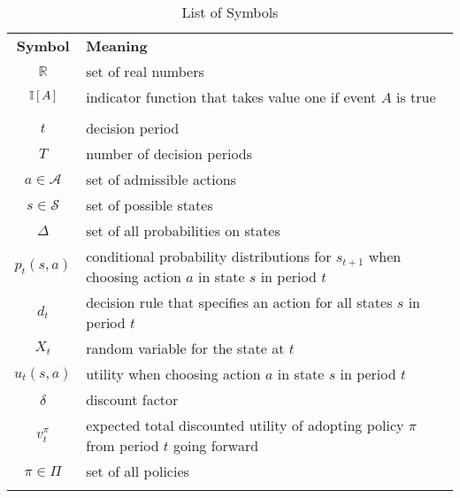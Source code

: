 \bgroup
\def\arraystretch{1.5}%
\tabulinesep=4.0mm
\begin{longtabu} to \textwidth{CL}
\caption{List of Symbols}
\setlength\extrarowheight{0pt}\\ %
\bottomrule
\textbf{Symbol} & \textbf{Meaning} \\\midrule
\endhead
\bottomrule
\endfoot
    $\mathbb{R}$                        & set of real numbers\\
    $\mathbb{I}\,[\,A\,]$                       & indicator function that takes value one if event $A$ is true\\
    \midrule{}\\\midrule
    $t$                                 & decision period \\
    $T$                                 & number of decision periods\\
    $a \in \mathcal{A}$                 & set of admissible actions\\
    $s \in \mathcal{S}$                 & set of possible states\\
    $\Delta$                            & set of all probabilities on states \\
    $p_t(s, a)$                         & conditional probability distributions for $s_{t + 1}$ when choosing action $a$ in state $s$ in period $t$\\
    $d_t$                               & decision rule that specifies an action for all states $s$ in period $t$\\
    $X_t$                               & random variable for the state at $t$ \\
    $u_t(s, a)$                         & utility when choosing action $a$ in state $s$ in period $t$\\
    $\delta$                            & discount factor\\
    $v^\pi_t$                           & expected total discounted utility of adopting policy $\pi$ from period $t$ going forward\\
    $\pi \in \Pi$                       & set of all policies\\
    \midrule{}\\\midrule

\end{longtabu}
